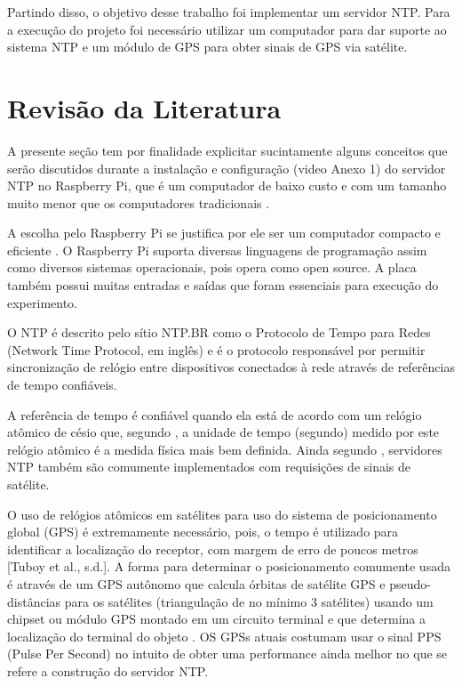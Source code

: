 \documentclass[12pt]{article}
\begin{document}
Partindo disso, o objetivo desse trabalho foi implementar um servidor NTP. Para a execução do projeto foi necessário utilizar um computador para dar suporte ao sistema NTP e um módulo de GPS para obter sinais de GPS via satélite.

\section{Revisão da Literatura}
A presente seção tem por finalidade explicitar sucintamente alguns conceitos que serão discutidos durante a instalação e configuração (video Anexo 1) do servidor NTP no Raspberry Pi, que é um computador de baixo custo e com um tamanho muito menor que os computadores tradicionais \cite{foundation}.

A escolha pelo Raspberry Pi se justifica por ele ser um computador compacto e eficiente \cite{nayyar}. O Raspberry Pi suporta diversas linguagens de programação assim como diversos sistemas operacionais, pois opera como open source. A placa também possui muitas entradas e saídas que foram essenciais para execução do experimento.

O NTP é descrito pelo sítio NTP.BR \cite{ntp-br} como o Protocolo de Tempo para Redes (Network Time Protocol, em inglês) e é o protocolo responsável por permitir sincronização de relógio entre dispositivos conectados à rede através de referências de tempo confiáveis. 

A referência de tempo é confiável quando ela está de acordo com um relógio atômico de césio que, segundo \cite{tuboy}, a unidade de tempo (segundo) medido por este relógio atômico é a medida física mais bem definida. Ainda segundo \cite{tuboy}, servidores NTP também são comumente implementados com requisições de sinais de satélite. 

O uso de relógios atômicos em satélites para uso do sistema de posicionamento global (GPS) é extremamente necessário, pois, o tempo é utilizado para identificar a localização do receptor, com margem de erro de poucos metros [Tuboy et al., s.d.]. A forma para determinar o posicionamento comumente usada é através de um GPS autônomo que calcula órbitas de satélite GPS e pseudo-distâncias para os satélites (triangulação de no mínimo 3 satélites) usando um chipset ou módulo GPS montado em um circuito terminal e que determina a localização do terminal do objeto \cite{Jeon}. OS GPSs atuais costumam usar o sinal PPS (Pulse Per Second) no intuito de obter uma performance ainda melhor no que se refere a construção do servidor NTP\cite{corcoran}.
 
\end{document}
